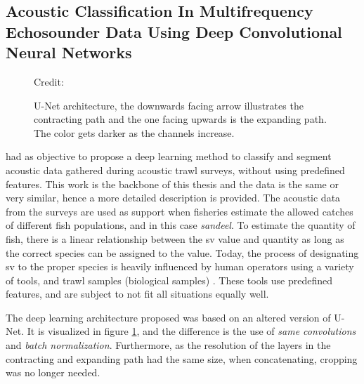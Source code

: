 \clearpage


\subsection{Acoustic Classification In Multifrequency Echosounder Data Using Deep Convolutional Neural Networks} \label{unet_paper_acoustic}
    
        \begin{figure}[H]
        \centering
        
        \caption[U-Net architecture]{U-Net architecture, the downwards facing arrow illustrates the contracting path and the one facing upwards is the expanding path. The color gets darker as the channels increase.}
      	\medskip 
        \label{unet__brautset_fig}
        \hspace*{15pt}\hbox{\scriptsize Credit: \citeauthor{brautaset2020acoustic}\cite{brautaset2020acoustic}}
    \end{figure}
    
    
    \citeauthor{brautaset2020acoustic}\cite{brautaset2020acoustic} had as objective to propose a deep learning method to classify and segment acoustic data gathered during acoustic trawl surveys, without using predefined features. This work is the backbone of this thesis and the data is the same or very similar, hence a more detailed description is provided. The acoustic data from the surveys are used as support when fisheries estimate the allowed catches of different fish populations, and in this case \textit{sandeel}. To estimate the quantity of fish, there is a linear relationship between the \gls{sv} value and quantity as long as the correct species can be assigned to the value. Today, the process of designating \gls{sv} to the proper species is heavily influenced by human operators using a variety of tools, and trawl samples (biological samples) \cite{korneliussen2016acoustic}. These tools use predefined features, and are subject to not fit all situations equally well. 
    
    The deep learning architecture proposed was based on an altered version of \citeauthor{unet_ronneberger2015}\cite{unet_ronneberger2015} U-Net\cite{brautaset2020acoustic}. It is visualized in figure \ref{unet__brautset_fig}, and the difference is the use of \textit{same convolutions} and \textit{batch normalization}. Furthermore, as the resolution of the layers in the contracting and expanding path had the same size, when concatenating, cropping was no longer needed. 
    
